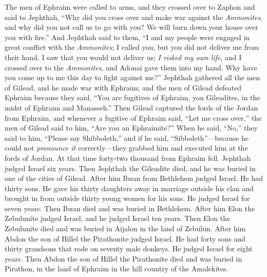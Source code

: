\begin{biblechapter} %
 The men of Ephraim were called to arms, and they crossed over to Zaphon and said to Jephthah, “Why did you cross over and make war against the \textit{Ammonites}, and why did you not call us to go with you? We will burn down your house over you with fire.”
\verse And Jephthah said to them, “I and my people were engaged in great conflict with the \textit{Ammonites}; I called you, but you did not deliver me from their hand.
\verse I saw that you would not deliver us; \textit{I risked my own life}, and I crossed over to the \textit{Ammonites}, and Adonai gave them into my hand. Why have you come up to me this day to fight against me?”
\verse Jephthah gathered all the men of Gilead, and he made war with Ephraim; and the men of Gilead defeated Ephraim because they said, “You are fugitives of Ephraim, you Gileadites, in the midst of Ephraim and Manasseh.”
\verse Then Gilead captured the fords of the Jordan from Ephraim, and whenever a fugitive of Ephraim said, “Let me cross over,” the men of Gilead said to him, “Are you an Ephraimite?” When he said, “No,”
\verse they said to him, “Please say Shibboleth,” and if he said, “Sibboleth”—because he could not \textit{pronounce it} correctly—they grabbed him and executed him at the fords of Jordan. At that time forty-two thousand from Ephraim fell.
\verse Jephthah judged Israel six years. Then Jephthah the Gileadite died, and he was buried in one of the cities of Gilead.
 After him Ibzan from Bethlehem judged Israel.
\verse He had thirty sons. He gave his thirty daughters away in marriage outside his clan and brought in from outside thirty young women for his sons. He judged Israel for seven years.
\verse Then Ibzan died and was buried in Bethlehem.
\verse After him Elon the Zebulunite judged Israel, and he judged Israel ten years.
\verse Then Elon the Zebulunite died and was buried in Aijalon in the land of Zebulun.
\verse After him Abdon the son of Hillel the Pirathonite judged Israel.
\verse He had forty sons and thirty grandsons that rode on seventy male donkeys. He judged Israel for eight years.
\verse Then Abdon the son of Hillel the Pirathonite died and was buried in Pirathon, in the land of Ephraim in the hill country of the Amalekites.
\end{biblechapter}


